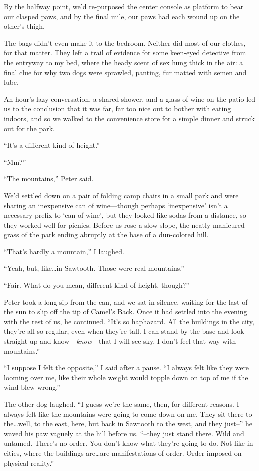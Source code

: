 By the halfway point, we'd re-purposed the center console as platform to bear our clasped paws, and by the final mile, our paws had each wound up on the other's thigh.

The bags didn't even make it to the bedroom. Neither did most of our clothes, for that matter. They left a trail of evidence for some keen-eyed detective from the entryway to my bed, where the heady scent of sex hung thick in the air: a final clue for why two dogs were sprawled, panting, fur matted with semen and lube.

An hour's lazy conversation, a shared shower, and a glass of wine on the patio led us to the conclusion that it was far, far too nice out to bother with eating indoors, and so we walked to the convenience store for a simple dinner and struck out for the park.

``It's a different kind of height.''

``Mm?''

``The mountains,'' Peter said.

We'd settled down on a pair of folding camp chairs in a small park and were sharing an inexpensive can of wine---though perhaps `inexpensive' isn't a necessary prefix to `can of wine', but they looked like sodas from a distance, so they worked well for picnics. Before us rose a slow slope, the neatly manicured grass of the park ending abruptly at the base of a dun-colored hill.

``That's hardly a mountain,'' I laughed.

``Yeah, but, like\ldots{}in Sawtooth. Those were real mountains.''

``Fair. What do you mean, different kind of height, though?''

Peter took a long sip from the can, and we sat in silence, waiting for the last of the sun to slip off the tip of Camel's Back. Once it had settled into the evening with the rest of us, he continued. ``It's so haphazard. All the buildings in the city, they're all so regular, even when they're tall. I can stand by the base and look straight up and know---\emph{know}---that I will see sky. I don't feel that way with mountains.''

``I suppose I felt the opposite,'' I said after a pause. ``I always felt like they were looming over me, like their whole weight would topple down on top of me if the wind blew wrong.''

The other dog laughed. ``I guess we're the same, then, for different reasons. I always felt like the mountains were going to come down on me. They sit there to the\ldots{}well, to the east, here, but back in Sawtooth to the west, and they just--'' he waved his paw vaguely at the hill before us. ``--they just stand there. Wild and untamed. There's no order. You don't know what they're going to do. Not like in cities, where the buildings are\ldots{}are manifestations of order. Order imposed on physical reality.''

